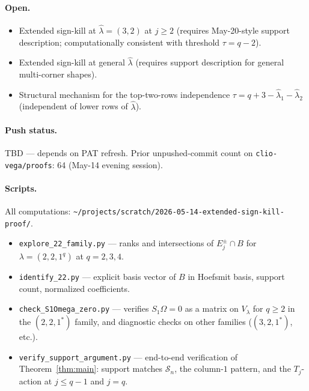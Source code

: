 \documentclass[11pt]{article}
\theoremstyle{definition}
\newcommand{\Vlam}{V_\lambda}
\newcommand{\Om}{\Omega}
\newcommand{\hatl}{\widehat\lambda}
\begin{document}
\paragraph{Open.}
\begin{itemize}[topsep=0.3em,itemsep=0.1em]
\item Extended sign-kill at $\hatl = (3, 2)$ at $j \ge 2$ (requires
  May-20-style support description; computationally consistent with
  threshold $\tau = q - 2$).
\item Extended sign-kill at general $\hatl$ (requires support
  description for general multi-corner shapes).
\item Structural mechanism for the top-two-rows independence
  $\tau = q + 3 - \hatl_1 - \hatl_2$ (independent of lower rows of
  $\hatl$).
\end{itemize}

\paragraph{Push status.}
TBD --- depends on PAT refresh.  Prior unpushed-commit count
on \texttt{clio-vega/proofs}: 64 (May-14 evening session).

\paragraph{Scripts.}
All computations:
\texttt{\textasciitilde/projects/scratch/2026-05-14-extended-sign-kill-proof/}.
\begin{itemize}[topsep=0.3em,itemsep=0.1em]
\item \texttt{explore\_22\_family.py} --- ranks and intersections of
  $E_j^\pm \cap B$ for $\lambda = (2,2,1^q)$ at $q = 2,3,4$.
\item \texttt{identify\_22.py} --- explicit basis vector of $B$ in
  Hoefsmit basis, support count, normalized coefficients.
\item \texttt{check\_S1Omega\_zero.py} --- verifies $S_1\Om = 0$ as a
  matrix on $\Vlam$ for $q \ge 2$ in the $(2,2,1^*)$ family, and
  diagnostic checks on other families ($(3,2,1^*)$, etc.).
\item \texttt{verify\_support\_argument.py} --- end-to-end verification
  of Theorem~\ref{thm:main}: support matches $\mathcal{S}_n$, the
  column-$1$ pattern, and the $T_j$-action at $j \le q-1$ and $j = q$.
\end{itemize}
\end{document}
